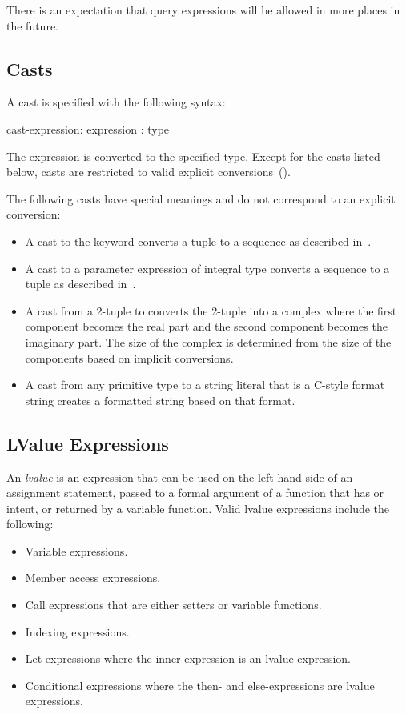 There is an expectation that query expressions will be allowed in more
places in the future.

\subsection{Casts}
\label{Casts}

A cast is specified with the following syntax:
\begin{syntax}
cast-expression:
  expression : type
\end{syntax}
The expression is converted to the specified type.  Except for the
casts listed below, casts are restricted to valid explicit
conversions~().

The following casts have special meanings and do not correspond to an
explicit conversion:
\begin{itemize}
\item {}
  A cast to the keyword  converts a tuple to a sequence as
  described in~.
\item {}
  A cast to a parameter expression of integral type converts a
  sequence to a tuple as described
  in~.
\item {}
  A cast from a 2-tuple to  converts the 2-tuple into a
  complex where the first component becomes the real part and the
  second component becomes the imaginary part.  The size of the
  complex is determined from the size of the components based on
  implicit conversions.
\item {}
  A cast from any primitive type to a string literal that is a C-style
  format string creates a formatted string based on that format.
\end{itemize}

\subsection{LValue Expressions}
\label{lvalue}

An {\em lvalue} is an expression that can be used on the left-hand
side of an assignment statement, passed to a formal argument of a
function that has  or  intent, or returned by a
variable function.  Valid lvalue expressions include the following:
\begin{itemize}
\item
 Variable expressions.
\item
 Member access expressions.
\item
 Call expressions that are either setters or variable functions.
\item
 Indexing expressions.
\item
 Let expressions where the inner expression is an lvalue expression.
\item
 Conditional expressions where the then- and else-expressions are
 lvalue expressions.
\end{itemize}

